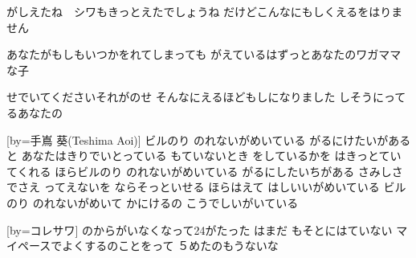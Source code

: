 \documentclass{article}
\newenvironment{Japanese}{%
\CJKfamily{min}%
\CJKtilde
\CJKnospace}{}
\begin{document}
\begin{CJK}{UTF8}{}
\begin{Japanese}
\begin{songs}{}
がしえたね　シワもきっとえたでしょうね
だけどこんなにもしくえるをはりません

あなたがもしもいつかをれてしまっても
がえているはずっとあなたのワガママな子

せでいてくださいそれがのせ
そんなにえるほどもしになりました
しそうにってるあなたの

\endverse
\endsong
[by=手嶌 葵(Teshima Aoi)]
\beginverse
{}ビルのり
のれないがめいている
がるにけたいがあると
あなたはきりでいとっている
もていないとき
をしているかを
はきっとていてくれる
ほらビルのり
のれないがめいている
がるにしたいちがある
さみしさでさえ
ってえないを
ならそっといせる
ほらはえて
はしいいがめいている
ビルのり
のれないがめいて
かにけるの
こうでしいがいている
\endverse
\endsong

[by=コレサワ]
\beginverse
{}のからがいなくなって24がたった
はまだ
もそとにはていない
マイペースでよくするのことをって
５めたのもうないな


\end{songs}
\end{Japanese}
\end{CJK}
\end{document}
